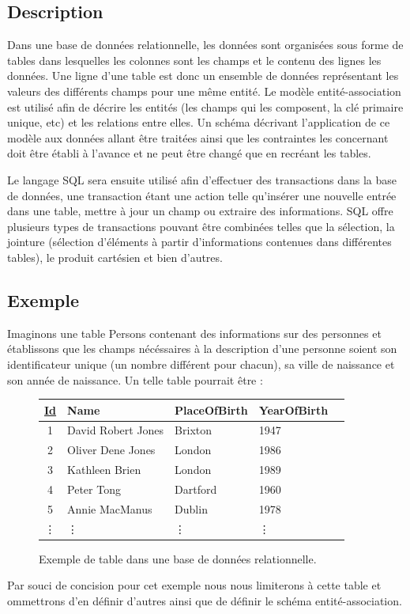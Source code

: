 \documentclass[11pt]{article}
\begin{document}
\subsection{Description}
Dans une base de données relationnelle, les données sont organisées sous forme de tables dans lesquelles les colonnes sont les champs et le contenu des lignes les données. Une ligne d'une table est donc un ensemble de données représentant les valeurs des différents champs pour une même entité. Le modèle entité-association est utilisé afin de décrire les entités (les champs qui les composent, la clé primaire unique, etc) et les relations entre elles. Un schéma décrivant l'application de ce modèle aux données allant être traitées ainsi que les contraintes les concernant doit être établi à l'avance et ne peut être changé que en recréant les tables.

Le langage SQL sera ensuite utilisé afin d'effectuer des transactions dans la base de données, une transaction étant une action telle qu'insérer une nouvelle entrée dans une table, mettre à jour un champ ou extraire des informations. SQL offre plusieurs types de transactions pouvant être combinées telles que la sélection, la jointure (sélection d'éléments à partir d'informations contenues dans différentes tables), le produit cartésien et bien d'autres. 
\subsection{Exemple}
Imaginons une table Persons contenant des informations sur des personnes et établissons que les champs nécéssaires à la description d'une personne soient son identificateur unique (un nombre différent pour chacun), sa ville de naissance et son année de naissance. Un telle table pourrait être :
\begin{figure}[H]
  \centering
  \begin{center}
    \begin{tabular}{| c | l | l | l | l |}
      \hline
      \textbf{\underline{Id}} & \textbf{Name} & \textbf{PlaceOfBirth} & \textbf{YearOfBirth} \\
      \hline
      \hline
      1 & David Robert Jones & Brixton & 1947 \\
      \hline
      2 & Oliver Dene Jones & London & 1986  \\
      \hline
      3 & Kathleen Brien & London & 1989 \\
      \hline
      4 & Peter Tong & Dartford & 1960 \\
      \hline
      5 & Annie MacManus & Dublin & 1978 \\
      \hline
      \vdots & \vdots & \vdots & \vdots \\
    \end{tabular}
  \end{center} 
  \caption{Exemple de table dans une base de données relationnelle.}
\end{figure}
Par souci de concision pour cet exemple nous nous limiterons à cette table et ommettrons d'en définir d'autres ainsi que de définir le schéma entité-association.
\end{document}
